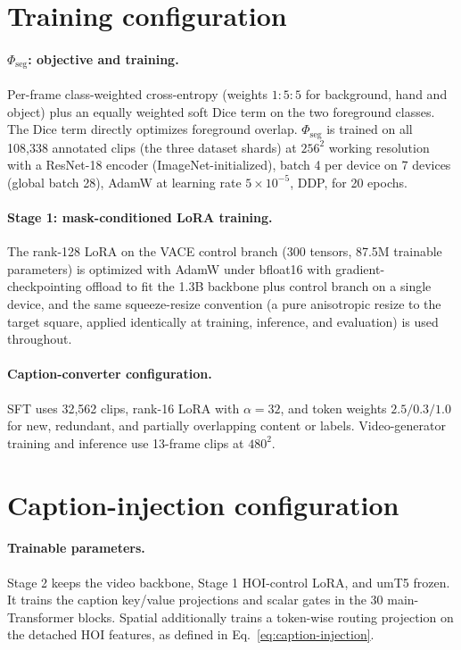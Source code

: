 \documentclass{article} %
\begin{document}
\section{Training configuration}
\label{app:impl}

\paragraph{$\Phi_{\text{seg}}$: objective and training.}
Per-frame class-weighted cross-entropy (weights $1{:}5{:}5$ for background,
hand and object) plus an equally weighted soft Dice term on the two
foreground classes. The Dice term directly optimizes foreground overlap. $\Phi_{\text{seg}}$ is trained on all
108{,}338 annotated clips (the three dataset shards) at $256^2$ working
resolution with a ResNet-18 encoder (ImageNet-initialized), batch 4 per
device on 7 devices (global batch 28), AdamW at learning rate
$5\times10^{-5}$, DDP, for 20 epochs.

\paragraph{Stage 1: mask-conditioned LoRA training.} The rank-128 LoRA on
the VACE control branch (300 tensors, 87.5M trainable parameters) is
optimized with AdamW under bfloat16 with gradient-checkpointing offload to
fit the 1.3B backbone plus control branch on a single device, and the same
squeeze-resize convention (a pure anisotropic resize to the target square,
applied identically at training, inference, and evaluation) is used
throughout.

\paragraph{Caption-converter configuration.}
SFT uses 32{,}562 clips, rank-16 LoRA with $\alpha=32$, and token weights
$2.5/0.3/1.0$ for new, redundant, and partially overlapping content or labels.
Video-generator training and inference use 13-frame clips at $480^2$.

\section{Caption-injection configuration}
\label{app:code}

\paragraph{Trainable parameters.}
Stage 2 keeps the video backbone, Stage 1 HOI-control LoRA, and umT5 frozen.
It trains the caption key/value projections and scalar gates in the 30
main-Transformer blocks. Spatial additionally trains a token-wise routing
projection on the detached HOI features, as defined in
Eq.~\ref{eq:caption-injection}.
\end{document}
